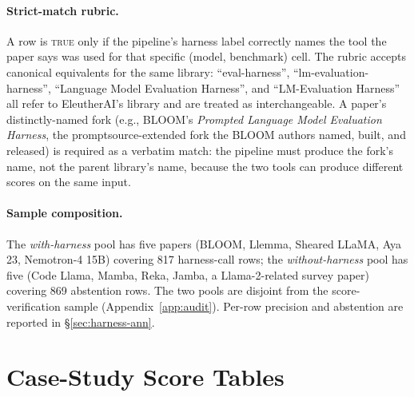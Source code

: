 \documentclass[11pt]{article}
\begin{document}
\paragraph{Strict-match rubric.} A row is \textsc{true} only if the
pipeline's harness label correctly names the tool the paper says was used
for that specific (model, benchmark) cell. The rubric accepts canonical
equivalents for the same library: ``eval-harness'', ``lm-evaluation-harness'',
``Language Model Evaluation Harness'', and ``LM-Evaluation Harness'' all
refer to EleutherAI's library and are treated as interchangeable. A
paper's distinctly-named fork (e.g., BLOOM's \emph{Prompted Language
Model Evaluation Harness}, the promptsource-extended fork the BLOOM
authors named, built, and released) is required as a verbatim match: the
pipeline must produce the fork's name, not the parent library's name,
because the two tools can produce different scores on the same input.

\paragraph{Sample composition.} The \emph{with-harness} pool has five
papers (BLOOM, Llemma, Sheared LLaMA, Aya 23, Nemotron-4 15B) covering
817 harness-call rows; the \emph{without-harness} pool has five (Code Llama, Mamba,
Reka, Jamba, a Llama-2-related survey paper) covering 869 abstention rows. The two
pools are disjoint from the score-verification sample
(Appendix~\ref{app:audit}). Per-row precision and abstention are reported
in \S\ref{sec:harness-ann}.


\section{Case-Study Score Tables}
\label{app:casetables}

\begin{table}[ht]
\centering
\small
\setlength{\tabcolsep}{4pt}%
\caption{Gemma-7B BBH scores across sources (\S\ref{sec:bbh}). The
$\approx$35-point gap reflects two undocumented choices: OLv2's multiple-choice
log-likelihood scoring (raw \texttt{acc\_norm} 43.62\%) vs.\ the ArXiv papers'
chain-of-thought generation, and OLv2's display normalisation of that raw score to
21.12. The final row is reported
under the surface label ``BigBench-Hard''; it is shown for completeness but held
out of the automated cross-source collision counts (\S\ref{sec:bbh}).}
\label{tab:bbh-app}
\end{table}
\end{document}
